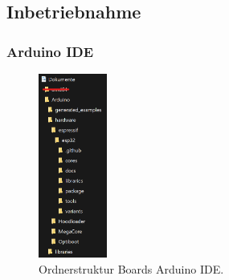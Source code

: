 %
%
%
%
%
%
%
%
%
%

\subsection{Inbetriebnahme}

\subsubsection{Arduino IDE}\label{Appendix:ESP32_Arduino_IDE}

\begin{figure}[H]
	\centering
	\includegraphics[width=0.2\textwidth]{graphics/ESP32_Ordner}
	\caption{Ordnerstruktur Boards Arduino IDE.}
	\label{fig:ESP32_Ordner}
\end{figure}


